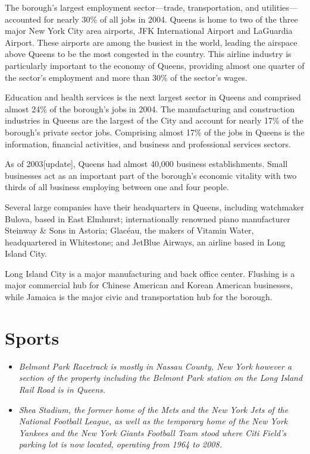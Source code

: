 The borough's largest employment sector---trade, transportation, and
utilities---accounted for nearly 30\% of all jobs in 2004. Queens is
home to two of the three major New York City area airports, JFK
International Airport and LaGuardia Airport. These airports are among
the busiest in the world, leading the airspace above Queens to be the
most congested in the country. This airline industry is particularly
important to the economy of Queens, providing almost one quarter of the
sector's employment and more than 30\% of the sector's wages.

Education and health services is the next largest sector in Queens and
comprised almost 24\% of the borough's jobs in 2004. The manufacturing
and construction industries in Queens are the largest of the City and
account for nearly 17\% of the borough's private sector jobs. Comprising
almost 17\% of the jobs in Queens is the information, financial
activities, and business and professional services sectors.

As of 2003{[}update{]}, Queens had almost 40,000 business
establishments. Small businesses act as an important part of the
borough's economic vitality with two thirds of all business employing
between one and four people.

Several large companies have their headquarters in Queens, including
watchmaker Bulova, based in East Elmhurst; internationally renowned
piano manufacturer Steinway \& Sons in Astoria; Glacéau, the makers of
Vitamin Water, headquartered in Whitestone; and JetBlue Airways, an
airline based in Long Island City.

Long Island City is a major manufacturing and back office center.
Flushing is a major commercial hub for Chinese American and Korean
American businesses, while Jamaica is the major civic and transportation
hub for the borough.

\section{Sports}\label{sports}

\begin{itemize}
\item
  \emph{Belmont Park Racetrack is mostly in Nassau County, New York
  however a section of the property including the Belmont Park station
  on the Long Island Rail Road is in Queens.}
\item
  \emph{Shea Stadium, the former home of the Mets and the New York Jets
  of the National Football League, as well as the temporary home of the
  New York Yankees and the New York Giants Football Team stood where
  Citi Field's parking lot is now located, operating from 1964 to 2008.}
\end{itemize}

